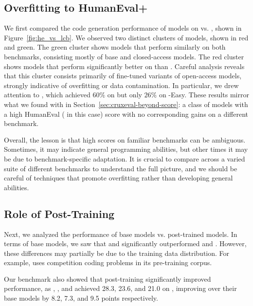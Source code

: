 

\subsection[Overfitting to HumanEval+]{Overfitting to HumanEval+}

We first compared the code generation performance of models on \humanevalplus{} vs. \livecodebench{},
shown in Figure~\ref{fig:he_vs_lcb}. We observed two distinct clusters of models, shown in red and green. The green cluster shows models that perform
similarly on both benchmarks, consisting mostly of base and closed-access models.
The red cluster shows models that perform significantly better on \humanevalplus{} than \livecodebench{}. Careful analysis reveals that
this cluster consists primarily of fine-tuned variants of open-access models, strongly indicative of overfitting
or data contamination.  In particular, we drew attention to , which achieved
$60\%$ on \humanevalplus{} but only $26\%$ on \lcb{}-Easy.
These results mirror what we found with \benchmark{} in Section~\ref{sec:cruxeval-beyond-score}: a class of
models with a high HumanEval (\humanevalplus{} in this case) score with no corresponding gains
on a different benchmark.

Overall, the lesson is that high scores on familiar benchmarks can be ambiguous.
Sometimes, it may indicate general programming abilities, but other times it may be due to benchmark-specific adaptation.
It is crucial to compare across a varied suite of different benchmarks to understand the full picture, and we should be
careful of techniques that promote overfitting rather than developing general abilities.



\subsection{Role of Post-Training}
Next, we analyzed the performance of base models vs. post-trained models. In terms of
base models, we saw that \llamabase{} and \deepseek{} significantly outperformed \cllama{} and
\starcodertwo. However, these differences may partially be due to the training data
distribution. For example, \starcodertwo uses competition coding problems in its
pre-training corpus.

Our benchmark also showed that post-training significantly improved performance, as
, , and \phind{} achieved 28.3, 23.6, and 21.0  on \lcb{},
improving over their base models by 8.2, 7.3, and 9.5 points respectively.

